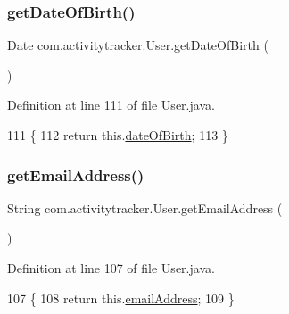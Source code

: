 \subsubsection{\texorpdfstring{get\+Date\+Of\+Birth()}{getDateOfBirth()}}
{\footnotesize\ttfamily Date com.\+activitytracker.\+User.\+get\+Date\+Of\+Birth (\begin{DoxyParamCaption}{ }\end{DoxyParamCaption})}



Definition at line 111 of file User.\+java.


\begin{DoxyCode}
111                                  \{
112         \textcolor{keywordflow}{return} this.\mbox{\hyperlink{classcom_1_1activitytracker_1_1_user_a40b0d4ce16246066c0e948edef864d94}{dateOfBirth}};
113     \}
\end{DoxyCode}
\mbox{\label{classcom_1_1activitytracker_1_1_user_a79d69ca90216e0552ac4cae9778ea40d}} 
\subsubsection{\texorpdfstring{get\+Email\+Address()}{getEmailAddress()}}
{\footnotesize\ttfamily String com.\+activitytracker.\+User.\+get\+Email\+Address (\begin{DoxyParamCaption}{ }\end{DoxyParamCaption})}



Definition at line 107 of file User.\+java.


\begin{DoxyCode}
107                                     \{
108         \textcolor{keywordflow}{return} this.\mbox{\hyperlink{classcom_1_1activitytracker_1_1_user_ac2fdb9a858d0295e52c5f8bc179e3137}{emailAddress}};
109     \}
\end{DoxyCode}
\mbox{\label{classcom_1_1activitytracker_1_1_user_a2a80ab659d02a07176b1793354131c00}} 
